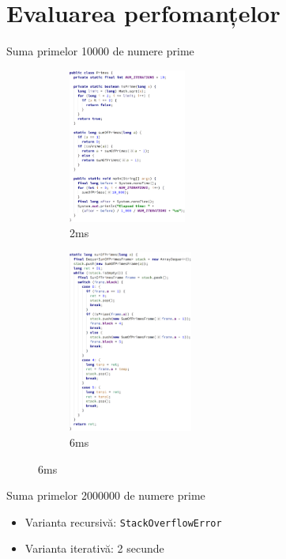 \documentclass{beamer}
\def\code#1{\texttt{#1}}
\begin{document}
\section{Evaluarea perfomanțelor}

\begin{frame}{Suma primelor 10000 de numere prime}
    \begin{figure}[htb]
        \begin{subfigure}[b]{.45\textwidth}
            \centering
            \includegraphics[height=2in]{../../../theses/diploma/src/img/primes-before-33.png}
            \caption{2ms}
        \end{subfigure}
        \begin{subfigure}[b]{.45\textwidth}
            \centering
            \includegraphics[height=2.36in]{../../../theses/diploma/src/img/primes-after-39.png}
            \caption{6ms}
        \end{subfigure}
    \end{figure}
\end{frame}

\begin{frame}{Suma primelor 2000000 de numere prime}
    \begin{itemize}
        \item Varianta recursivă: \code{StackOverflowError}
        \item Varianta iterativă: 2 secunde
    \end{itemize}
\end{frame}
\end{document}
